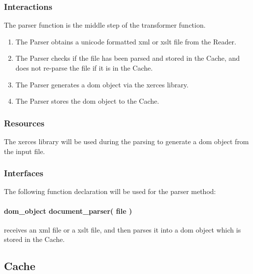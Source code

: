 \subsubsection{Interactions}

The parser function is the middle step of the transformer function.

\begin{enumerate}
\item The Parser obtains a \gls{unicode} formatted \gls{xml} or \gls{xslt} file from the Reader.
\item The Parser checks if the file has been parsed and stored in the Cache, and does not re-parse the file if it is in the Cache.
\item The Parser generates a \gls{dom} object via the \gls{xerces} library.
\item The Parser stores the \gls{dom} object to the Cache.
\end{enumerate}

\subsubsection{Resources}

The \gls{xerces} library will be used during the parsing to generate a \gls{dom} object from the input file.

\subsubsection{Interfaces}

The following function declaration will be used for the parser method:

\paragraph{dom\_object document\_parser( file )} receives an \gls{xml} file or a \gls{xslt} file, and then parses it into a \gls{dom} object which is stored in the Cache.

\subsection{Cache}
\label{cache}

